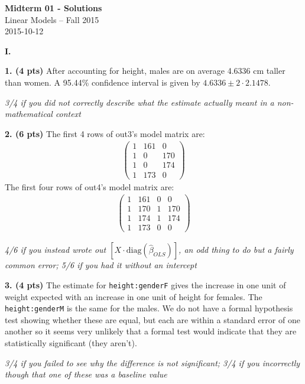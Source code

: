 \documentclass[12pt]{article}
\begin{document}
\begin{center}
{\bf Midterm 01 - Solutions} \\
Linear Models -- Fall 2015 \\
2015-10-12
\end{center}

\medskip

{\bf I.}

{\bf 1. (4 pts)} After accounting for height, males are on average 4.6336 cm taller than women.
A 95.44\% confidence interval is given by $4.6336 \pm 2 \cdot 2.1478$.

{\it 3/4 if you did not correctly describe what the estimate actually meant in a non-mathematical
context}

{\bf 2. (6 pts)} The first 4 rows of out3's model matrix are:
\begin{align*}
\left(\begin{array}{ccc}
1 & 161 & 0 \\
1 & 0 & 170 \\
1 & 0 & 174 \\
1 & 173 & 0
\end{array}\right)
\end{align*}
The first four rows of out4's model matrix are:
\begin{align*}
\left(\begin{array}{cccc}
1 & 161 & 0 & 0 \\
1 & 170 & 1 & 170 \\
1 & 174 & 1 & 174 \\
1 & 173 & 0 & 0
\end{array}\right)
\end{align*}

{\it 4/6 if you instead wrote out $\left[ X \cdot \text{diag}(\widehat{\beta}_{OLS}) \right]$,
an odd thing to do but a fairly common error; 5/6 if you had it without an intercept}

{\bf 3. (4 pts)} The estimate for \texttt{height:genderF} gives the increase in one unit of
weight expected with an increase in one unit of height for females. The \texttt{height:genderM}
is the same for the males. We do not have a formal hypothesis test showing whether these
are equal, but each are within a standard error of one another so it seems very
unlikely that a formal test would indicate that they are statistically significant (they aren't).

{\it 3/4 if you failed to see why the difference is not significant; 3/4 if you
incorrectly though that one of these was a baseline value}
\end{document}
